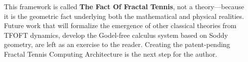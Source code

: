 \documentclass[11pt,a4paper]{article}
\begin{document}
\vspace{1cm}

This framework is called \textbf{The Fact Of Fractal Tennis}, not a theory—because it is the geometric fact underlying both the mathematical and physical realities. Future work that will formalize the emergence of other classical theories from TFOFT dynamics, develop the Godel-free calculus system based on Soddy geometry, are left as an exercise to the reader. Creating the patent-pending Fractal Tennis Computing Architecture is the next step for the author.
\end{document}
